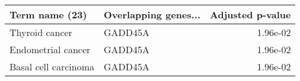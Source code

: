 \begin{tabular}{llr}
\toprule
      Term name (23) & Overlapping genes... &  Adjusted p-value \\
\midrule
      Thyroid cancer &              GADD45A &          1.96e-02 \\
  Endometrial cancer &              GADD45A &          1.96e-02 \\
Basal cell carcinoma &              GADD45A &          1.96e-02 \\
\bottomrule
\end{tabular}
